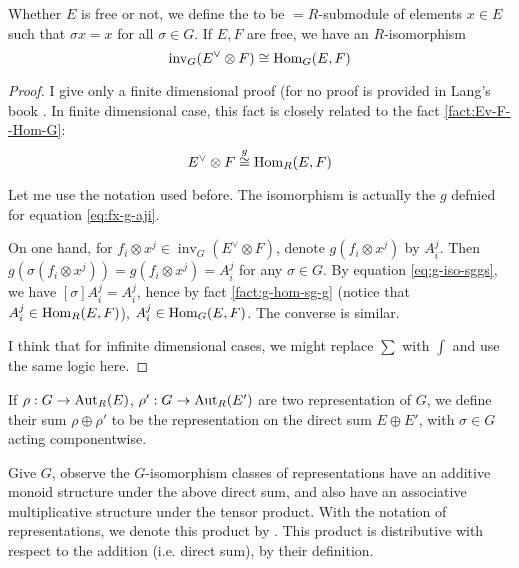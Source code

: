 \documentclass{article}
\begin{document}
Whether $E$ is free or not, we define the  to be $=
R$-submodule of elements $x\in E$ such that $\sigma x=x$ for all
$\sigma\in G$. If $E,F$ are free, we have an $R$-isomorphism
\begin{equation}
    \operatorname{inv}_G (E^\vee\otimes F) \cong \operatorname{Hom}_G(E,F)
\end{equation}
\begin{proof}
    I give only a finite dimensional proof (for no proof is provided
    in Lang's book \cite{lang-algebra}. In finite dimensional case,
    this fact is closely related to the fact \ref{fact:Ev-F--Hom-G}:
    \begin{equation*}
        E^\vee \otimes F \overset{g}{\cong} \operatorname{Hom}_R(E,F)
    \end{equation*}

    Let me use the notation used before. The isomorphism is actually
    the $g$ defnied for equation \ref{eq:fx-g-aji}.

    On one hand, for $f_i\otimes x^j \in \operatorname{inv}_G
    (E^\vee\otimes F)$, denote $g(f_i\otimes x^j)$ by $A^j_i$. Then
    $g(\sigma (f_i\otimes x^j)) = g(f_i\otimes x^j) = A^j_i$ for any
    $\sigma\in G$. By equation \ref{eq:g-iso-sggs}, we have
    $[\sigma]A^j_i = A^j_i$, hence by fact \ref{fact:g-hom-sg-g}
    (notice that $A^j_i\in \operatorname{Hom}_R(E,F)$), $A^j_i\in \operatorname{Hom}_G(E,F)$.  The
    converse is similar.

    I think that for infinite dimensional cases, we might replace
    $\sum$ with $\int$ and use the same logic here.
\end{proof}

\begin{defi}
If $\rho: G\to \operatorname{Aut}_R(E)$, $\rho':G\to \operatorname{Aut}_R(E')$ are two
representation of $G$, we define their sum $\rho\oplus \rho'$ to be
the representation on the direct sum $E\oplus E'$, with $\sigma\in G$
acting componentwise.
\end{defi}

Give $G$, observe the $G$-isomorphism classes of representations have
an additive monoid structure under the above direct sum, and also have
an associative multiplicative structure under the tensor product. With
the notation of representations, we denote this product by
. This product is distributive with respect
to the addition (i.e. direct sum), by their definition.
\end{document}
